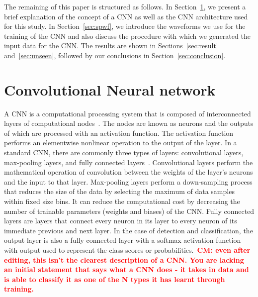 \documentclass[aps,twocolumn,showpacs,groupedaddress, nofootinbib]{revtex4}  %
\newcommand{\cm}[1]{\textbf{\textcolor{red}{CM: #1}}}
\begin{document}
%
%
The remaining of this paper is structured as follows. In Section~\ref{sec:CNN},
we present a brief explanation of the concept of a \ac{CNN} as well as the
\ac{CNN} architecture  used for this study. In Section~\ref{sec:spwf}, we
introduce the waveforms we use for the training of the \ac{CNN} and  also
discuss the procedure with which we generated the input data for the \ac{CNN}.
The results are shown in Sections~\ref{sec:result} and~\ref{sec:unseen},
followed by our conclusions in Section~\ref{sec:conclusion}.

\section{Convolutional Neural network}\label{sec:CNN}

%
%
A \ac{CNN} is a computational processing system that is composed of
interconnected layers of computational nodes~\cite{o2015introduction}. The
nodes are known as neurons and the outputs of which are processed with an
activation function. The activation function performs an elementwise nonlinear
operation to the output of the layer. In a standard \ac{CNN}, there are
commonly three types of layers: convolutional layers, max-pooling layers, and
fully connected layers~\cite{o2015introduction}. Convolutional layers perform
the mathematical operation of convolution between the weights of the layer's
neurons and the input to that layer. Max-pooling layers perform a down-sampling
process that reduces the size of the data by selecting the maximum of data
samples within fixed size bins. It can reduce the computational cost by
decreasing the number of trainable parameters (weights and biases) of the
\ac{CNN}.  Fully connected layers are layers that connect every neuron in its
layer to every neuron of its immediate previous and next layer. In the case of
detection and classification, the output layer is also a fully connected layer
with a softmax activation function with output used to represent the class
scores or probabilities.~\cm{even after editing, this isn't the clearest
description of a CNN. You are lacking an initial statement that says what a CNN
does - it takes in data and is able to classify it as one of the N types it has
learnt through training.}
\end{document}
